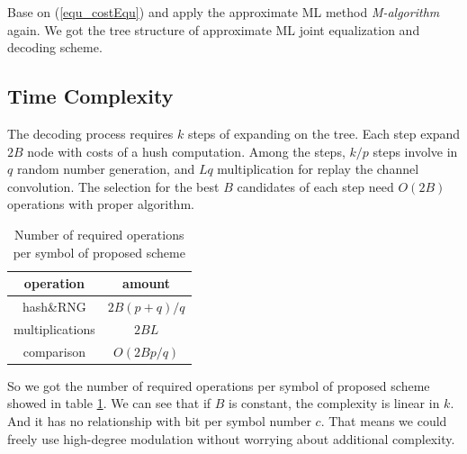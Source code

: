 \documentclass[conference]{IEEEtran}
\begin{document}
Base on (\ref{equ_costEqu}) and apply the approximate ML method \textit{M-algorithm} again. We got the tree structure of approximate ML joint equalization and decoding scheme.


\subsection{Time Complexity}
The decoding process requires $k$ steps of expanding on the tree. Each step expand $2B$ node with costs of a hush computation. Among the steps, $k/p$ steps involve in $q$ random number generation, and $Lq$ multiplication for replay the channel convolution. The selection for the best $B$ candidates of each step need $O(2B)$ operations with proper algorithm. 

\begin{table}[!t]
\renewcommand{\arraystretch}{1.3}
\centering
\caption{Number of required operations per symbol of proposed scheme}
\label{tab_ComplexitySpinal}
\begin{tabular}{|c||c|}
\hline
\textbf{operation} &\textbf{amount} \\
\hline
hash\&RNG  & $2B(p+q)/q$\\
\hline
multiplications& $2BL$\\
\hline
comparison & $O(2Bp/q)$\\
\hline

\end{tabular}

\end{table}

So we got the number of required operations per symbol of proposed scheme showed in table \ref{tab_ComplexitySpinal}. We can see that if $B$ is constant, the complexity is linear in $k$. And it has no relationship with bit per symbol number $c$. That means we could freely use high-degree modulation without worrying about additional complexity. 
\end{document}
